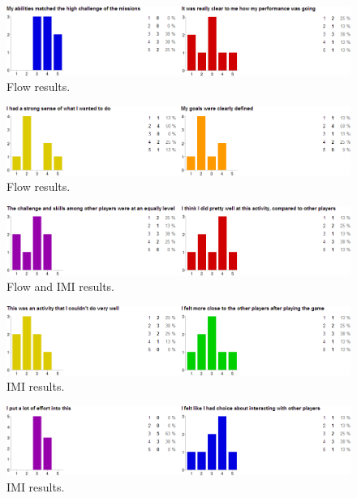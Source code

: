 \begin{figure}[htbp]
\centering
\includegraphics[width=1.0\textwidth]{Pictures/flow_3_senseOfControl}
\caption{Flow results.}
\label{fig:3}
\end{figure}

\begin{figure}[htbp]
\centering
\includegraphics[width=1.0\textwidth]{Pictures/flow_4_senseOfControl}
\caption{Flow results.}
\label{fig:4}
\end{figure}

\begin{figure}[htbp]
\centering
\includegraphics[width=1.0\textwidth]{Pictures/flow_5_senseOfControl}
\caption{Flow and IMI results.}
\label{fig:5}
\end{figure}

\begin{figure}[htbp]
\centering
\includegraphics[width=1.0\textwidth]{Pictures/imi_1}
\caption{IMI results.}
\label{fig:6}
\end{figure}

\begin{figure}[htbp]
\centering
\includegraphics[width=1.0\textwidth]{Pictures/imi_2}
\caption{IMI results.}
\label{fig:7}
\end{figure}

